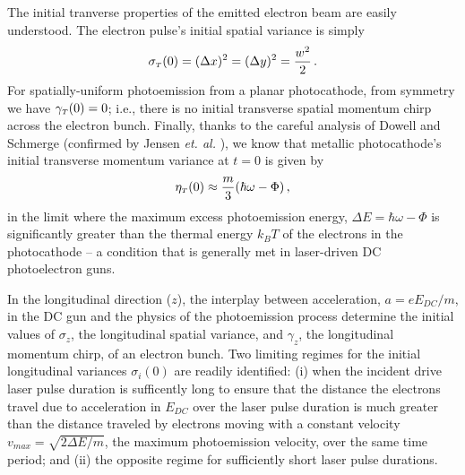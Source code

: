 The initial tranverse properties of the emitted electron beam are easily understood.
The electron pulse's initial spatial variance is simply
\begin{equation}
\sigma_{{\scriptscriptstyle T} } ( 0 ) = ( \Delta x )^{2} = ( \Delta y)^{2} = \frac{ w^{2} }{ 2 } \, \text{.}
\end{equation}
For spatially-uniform photoemission from a planar photocathode, from symmetry we have $ \gamma_{{\scriptscriptstyle T}} ( 0 ) = 0 $; i.e., there is no initial transverse spatial momentum chirp across the electron bunch.
Finally, thanks to the careful analysis of Dowell and Schmerge \cite{dowell_quantum_2009} (confirmed by Jensen \textit{et. al.} \cite{jensen_emittance_2010}), we know that metallic photocathode's initial transverse momentum variance at $ t = 0 $ is given by
\begin{equation} \label{eq:jensen_eta}
  \eta_{ {\scriptscriptstyle T} } ( 0 ) \approx \frac{ m }{ 3 } ( \hbar \omega - \Phi ) \, \text{,}
\end{equation}
in the limit where the maximum excess photoemission energy, $ \Delta E = \hbar \omega - \Phi $ is significantly greater than the thermal energy $ k_{B} T $ of the electrons in the photocathode -- a condition that is generally met in laser-driven DC photoelectron guns.

In the longitudinal direction ($z$), the interplay between acceleration, $ a = e E_{DC}/m $, in the DC gun and the physics of the photoemission process determine the initial values of $\sigma_z$, the longitudinal spatial variance, and $\gamma_z$, the longitudinal momentum chirp, of an electron bunch.
Two limiting regimes for the initial longitudinal variances $ \sigma_{i} ( 0 ) $ are readily identified: (i) when the incident drive laser pulse duration is sufficently long to ensure that the distance the electrons travel due to acceleration in $ E_{DC} $ over the laser pulse duration is much greater than the distance traveled by electrons moving with a constant velocity $ v_{max} = \sqrt{ 2 \Delta E / m } $, the maximum photoemission velocity, over the same time period; and (ii) the opposite regime for sufficiently short laser pulse durations.

